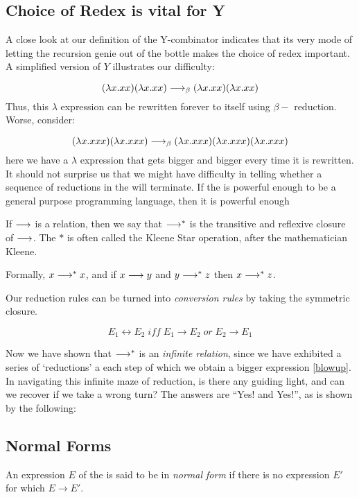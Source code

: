 \subsection{Choice of Redex is vital for Y}
A close look at our definition of the Y-combinator indicates that its very
mode of letting the recursion genie out of the bottle makes the choice of
redex important.  A simplified version of $Y$ illustrates our difficulty:

$$(\lambda x. x x)(\lambda x.x x)
\longrightarrow_\beta (\lambda x. x x)(\lambda x.x x)
$$
Thus, this $\lambda$ expression can be rewritten forever to itself using
$\beta-$ reduction.  Worse, consider:

\label{blowup}$$(\lambda x. x x x)(\lambda x.x x x)
\longrightarrow_\beta (\lambda x. x x x)(\lambda x.x x x)(\lambda x.x x x)
$$
here we have a $\lambda$ expression that gets bigger and bigger every time
it is rewritten. It should not surprise us that we might have difficulty in
telling whether a sequence of  reductions in the \LC will terminate. If the
\LC is powerful enough to be a general purpose programming language, then
it is powerful enough

If $\longrightarrow$ is a relation, then we say that $\longrightarrow^*$ is the
transitive and reflexive closure of $\longrightarrow$. The $*$ is often called
the Kleene Star operation, after the mathematician Kleene.

Formally, $x\longrightarrow^*x$, and if $x\longrightarrow y$ and $y\longrightarrow^*z$
then $x\longrightarrow^* z$.

Our reduction rules can be turned into {\em conversion rules} by taking the
symmetric closure.

  $$E_1 \longleftrightarrow E_2 \; iff \; E_1\longrightarrow E_2 \;or\;
      E_2\longrightarrow E_1$$


Now we have shown that $\longrightarrow^*$ is an {\em infinite relation}, since
we have exhibited a series of  `reductions' a each step of which we obtain
a bigger expression \ref{blowup}. In navigating this infinite maze of
reduction, is there any guiding light, and can we recover if we take a
wrong turn? The answers are ``Yes! and Yes!'', as is shown by the
following:

\subsection{Normal Forms}

An expression $E$ of the \LC is said to be in {\em normal form} if there
is no expression $E'$ for which $E\rightarrow E'$.


